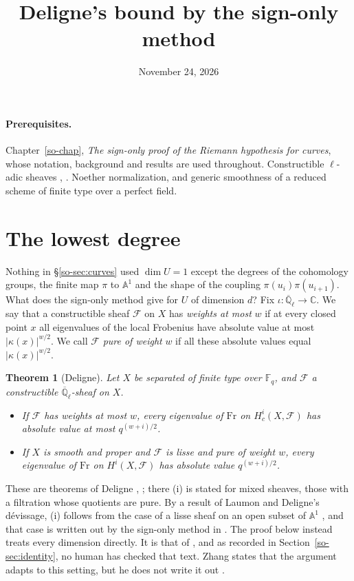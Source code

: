 \documentclass[reqno]{amsart}
\title{Deligne's bound by the sign-only method}
\author{}
\date{November 24, 2026}
\newcounter{chap}
\theoremstyle{definition}
\theoremstyle{plain}
\newtheorem{theorem}{Theorem}[section]
\newcommand{\Q}{\mathbb{Q}}
\newcommand{\C}{\mathbb{C}}
\newcommand{\F}{\mathbb{F}}
\newcommand{\A}{\mathbb{A}}
\newcommand{\Ql}{\overline{\Q}_\ell}
\newcommand{\cF}{\mathcal{F}}
\newcommand{\Fr}{\mathrm{Fr}}
\begin{document}
\maketitle
{}\label{chap}

\paragraph{Prerequisites.}
Chapter~\ref{so-chap}, \emph{The sign-only proof of the Riemann hypothesis for curves}, whose notation, background and results are used throughout.  Constructible \(\ell\)-adic sheaves \cite[Rapport]{SGA45}, \cite{Mil}.  Noether normalization, and generic smoothness of a reduced scheme of finite type over a perfect field.

\section{The lowest degree}\label{sec:lowest}

Nothing in \S\ref{so-sec:curves} used \(\dim U = 1\) except the degrees of the cohomology groups, the finite map \(\pi\) to \(\A^1\) and the shape of the coupling \(\pi(u_i)\pi(u_{i+1})\).  What does the sign-only method give for \(U\) of dimension \(d\)?  Fix \(\iota \colon \Ql \to \C\).  We say that a constructible sheaf \(\cF\) on \(X\) has \emph{weights at most} \(w\) if at every closed point \(x\) all eigenvalues of the local Frobenius have absolute value at most \(\lvert \kappa(x) \rvert^{w/2}\).  We call \(\cF\) \emph{pure of weight} \(w\) if all these absolute values equal \(\lvert \kappa(x) \rvert^{w/2}\).

\begin{theorem}[Deligne]\label{th:deligne}
Let \(X\) be separated of finite type over \(\F_q\), and \(\cF\) a constructible \(\Ql\)-sheaf on \(X\).
\begin{itemize}
\item[(i)] If \(\cF\) has weights at most \(w\), every eigenvalue of \(\Fr\) on \(H^i_c(X, \cF)\) has absolute value at most \(q^{(w+i)/2}\).
\item[(ii)] If \(X\) is smooth and proper and \(\cF\) is lisse and pure of weight \(w\), every eigenvalue of \(\Fr\) on \(H^i(X, \cF)\) has absolute value \(q^{(w+i)/2}\).
\end{itemize}
\end{theorem}

These are theorems of Deligne \cite{Del74}, \cite[Th\'eor\`eme~3.3.1]{Del80}; there (i) is stated for mixed sheaves, those with a filtration whose quotients are pure.  By a result of Laumon and Deligne's dévissage, (i) follows from the case of a lisse sheaf on an open subset of \(\A^1\) \cite[Remark~1.3]{Zh}, and that case is written out by the sign-only method in \cite{Zh}.  The proof below instead treats every dimension directly.  It is that of \cite{Ald}, and as recorded in Section~\ref{so-sec:identity}, no human has checked that text.  Zhang states that the argument adapts to this setting, but he does not write it out \cite[Remark~1.3]{Zh}.
\end{document}
